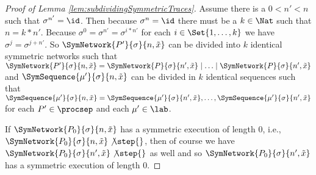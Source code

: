 \documentclass[11pt,techReport]{eptcs}
\begin{document}
\begin{proof}[Proof of Lemma \ref{lem:subdividingSymmetricTraces}]
	Assume there is a $ 0 < n' < n $ such that $ \sigma^{n'} = \id $. Then because $ \sigma^n = \id $ there must be a $ k \in \Nat $ such that $ n = k * n' $. Because $ \sigma^0 = \sigma^{n'} = \sigma^{i * n'} $ for each $ i \in \Set{ 1, \ldots, k } $ we have $ \sigma^j = \sigma^{j{+}n'} $. So $ \SymNetwork{P'}{\sigma}{n, \tilde{x}} $ can be divided into $ k $ identical symmetric networks such that $ \SymNetwork{P'}{\sigma}{n, \tilde{x}} = \SymNetwork{P}{\sigma}{n', \tilde{x}} \mid \ldots \mid \SymNetwork{P}{\sigma}{n', \tilde{x}} $ and $ \SymSequence{\mu'}{\sigma}{n, \tilde{x}} $ can be divided in $ k $ identical sequences such that $ \SymSequence{\mu'}{\sigma}{n, \tilde{x}} = \SymSequence{\mu'}{\sigma}{n', \tilde{x}}, \ldots, \SymSequence{\mu'}{\sigma}{n', \tilde{x}} $ for each $ P' \in \procsep $ and each $ \mu' \in \lab $.
	
	If $ \SymNetwork{P_0}{\sigma}{n, \tilde{x}} $ has a symmetric execution of length $ 0 $, i.e., $ \SymNetwork{P_0}{\sigma}{n, \tilde{x}} \not \step{} $, then of course we have $ \SymNetwork{P_0}{\sigma}{n', \tilde{x}} \not \step{} $ as well and so $ \SymNetwork{P_0}{\sigma}{n', \tilde{x}} $ has a symmetric execution of length $ 0 $.
	

\end{proof}
\end{document}
